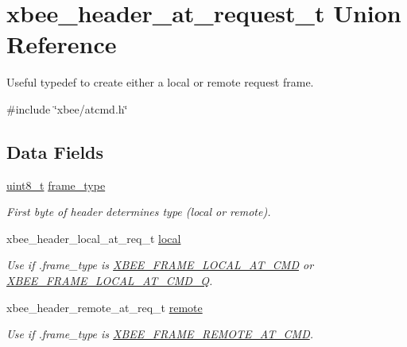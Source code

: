 \hypertarget{unionxbee__header__at__request__t}{}\section{xbee\+\_\+header\+\_\+at\+\_\+request\+\_\+t Union Reference}
\label{unionxbee__header__at__request__t}


Useful typedef to create either a local or remote request frame.  




{\ttfamily \#include \char`\"{}xbee/atcmd.\+h\char`\"{}}

\subsection*{Data Fields}
\begin{DoxyCompactItemize}
\item 
\mbox{\label{unionxbee__header__at__request__t_afa34d393db5fa915716b483011415ddc}} 
\hyperlink{group__hal__dos_gae1affc9ca37cfb624959c866a73f83c2}{uint8\+\_\+t} \hyperlink{unionxbee__header__at__request__t_afa34d393db5fa915716b483011415ddc}{frame\+\_\+type}
\begin{DoxyCompactList}\small\item\em First byte of header determines type (local or remote). \end{DoxyCompactList}\item 
xbee\+\_\+header\+\_\+local\+\_\+at\+\_\+req\+\_\+t \hyperlink{unionxbee__header__at__request__t_aae9b1a9bf279fa1932c6222e3d4b5da2}{local}
\begin{DoxyCompactList}\small\item\em Use if .frame\+\_\+type is \hyperlink{group__xbee__device_gga7753bbebaf00d6d64942f64b6ae9b7b9a540fdafbf3dbb8b5d07be5888e3573ee}{X\+B\+E\+E\+\_\+\+F\+R\+A\+M\+E\+\_\+\+L\+O\+C\+A\+L\+\_\+\+A\+T\+\_\+\+C\+MD} or \hyperlink{group__xbee__device_gga7753bbebaf00d6d64942f64b6ae9b7b9a4dccc9c3f9859247218c0d0a93e2582a}{X\+B\+E\+E\+\_\+\+F\+R\+A\+M\+E\+\_\+\+L\+O\+C\+A\+L\+\_\+\+A\+T\+\_\+\+C\+M\+D\+\_\+Q}. \end{DoxyCompactList}\item 
\mbox{\label{unionxbee__header__at__request__t_afaac4d50b8627529565a1d55950c44f6}} 
xbee\+\_\+header\+\_\+remote\+\_\+at\+\_\+req\+\_\+t \hyperlink{unionxbee__header__at__request__t_afaac4d50b8627529565a1d55950c44f6}{remote}
\begin{DoxyCompactList}\small\item\em Use if .frame\+\_\+type is \hyperlink{group__xbee__device_gga7753bbebaf00d6d64942f64b6ae9b7b9a44cc0afd79605edfc1f4d5cbb7ed62a2}{X\+B\+E\+E\+\_\+\+F\+R\+A\+M\+E\+\_\+\+R\+E\+M\+O\+T\+E\+\_\+\+A\+T\+\_\+\+C\+MD}. \end{DoxyCompactList}\end{DoxyCompactItemize}


